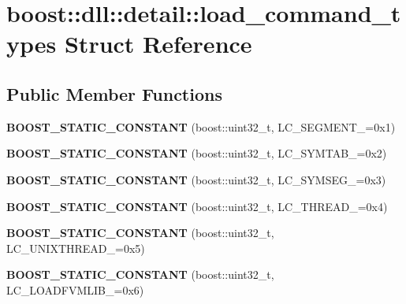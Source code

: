 \hypertarget{a00194}{}\section{boost\+:\+:dll\+:\+:detail\+:\+:load\+\_\+command\+\_\+types Struct Reference}
\label{a00194}
\subsection*{Public Member Functions}
\begin{DoxyCompactItemize}
\item 
{\bfseries B\+O\+O\+S\+T\+\_\+\+S\+T\+A\+T\+I\+C\+\_\+\+C\+O\+N\+S\+T\+A\+NT} (boost\+::uint32\+\_\+t, L\+C\+\_\+\+S\+E\+G\+M\+E\+N\+T\+\_\+=0x1)\hypertarget{a00194_a37af740c72aa8928ea08b7b028d7ac23}{}\label{a00194_a37af740c72aa8928ea08b7b028d7ac23}

\item 
{\bfseries B\+O\+O\+S\+T\+\_\+\+S\+T\+A\+T\+I\+C\+\_\+\+C\+O\+N\+S\+T\+A\+NT} (boost\+::uint32\+\_\+t, L\+C\+\_\+\+S\+Y\+M\+T\+A\+B\+\_\+=0x2)\hypertarget{a00194_a7a69d7d9fa498d1a3efe6825c2787336}{}\label{a00194_a7a69d7d9fa498d1a3efe6825c2787336}

\item 
{\bfseries B\+O\+O\+S\+T\+\_\+\+S\+T\+A\+T\+I\+C\+\_\+\+C\+O\+N\+S\+T\+A\+NT} (boost\+::uint32\+\_\+t, L\+C\+\_\+\+S\+Y\+M\+S\+E\+G\+\_\+=0x3)\hypertarget{a00194_a88e5d748f22fb6b63acf0e04fc5cfd96}{}\label{a00194_a88e5d748f22fb6b63acf0e04fc5cfd96}

\item 
{\bfseries B\+O\+O\+S\+T\+\_\+\+S\+T\+A\+T\+I\+C\+\_\+\+C\+O\+N\+S\+T\+A\+NT} (boost\+::uint32\+\_\+t, L\+C\+\_\+\+T\+H\+R\+E\+A\+D\+\_\+=0x4)\hypertarget{a00194_a1cabaca254df2f28ea5e33e35511bf95}{}\label{a00194_a1cabaca254df2f28ea5e33e35511bf95}

\item 
{\bfseries B\+O\+O\+S\+T\+\_\+\+S\+T\+A\+T\+I\+C\+\_\+\+C\+O\+N\+S\+T\+A\+NT} (boost\+::uint32\+\_\+t, L\+C\+\_\+\+U\+N\+I\+X\+T\+H\+R\+E\+A\+D\+\_\+=0x5)\hypertarget{a00194_a8bcd23c5397bfc91cd90da9d0d437816}{}\label{a00194_a8bcd23c5397bfc91cd90da9d0d437816}

\item 
{\bfseries B\+O\+O\+S\+T\+\_\+\+S\+T\+A\+T\+I\+C\+\_\+\+C\+O\+N\+S\+T\+A\+NT} (boost\+::uint32\+\_\+t, L\+C\+\_\+\+L\+O\+A\+D\+F\+V\+M\+L\+I\+B\+\_\+=0x6)\hypertarget{a00194_aa7b6b99f240568ce2376a0a21097fb5a}{}\label{a00194_aa7b6b99f240568ce2376a0a21097fb5a}


\end{DoxyCompactItemize}
